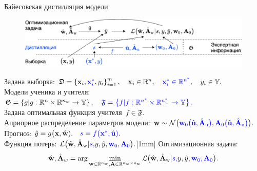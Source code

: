 \documentclass[10pt,pdf,hyperref={unicode}]{beamer}
\begin{document}
\begin{frame}{Байесовская дистилляция модели}
\justifying
\begin{figure}[h!]
\includegraphics[width=1.0\textwidth]{slides/figures/introdigram_large}
\end{figure}

Задана выборка:
$
	\mathfrak{D} = \left\{\textbf{x}_i, {\color{blue}\textbf{x}_i^{*}}, y_i\right\}_{i=1}^{m}, 
	\quad \textbf{x}_{i} \in \mathbb{R}^{n}, 
	{\color{blue}\quad \textbf{x}_{i}^{*} \in \mathbb{R}^{n^{*}}},
	\quad y_i \in \mathbb{Y}.
$\\[1mm]
Модели ученика и учителя:
$
    \mathfrak{G} = \left\{g | g : \mathbb{R}^{n}\times \mathbb{R}^{n_{w}} \to \mathbb{Y} \right\},
{\color{blue}
    \quad \mathfrak{F} = \left\{f | f : \mathbb{R}^{n^{*}}\times \mathbb{R}^{n_{w}^{*}} \to \mathbb{Y} \right\}.
}
$\\[1mm]
{\color{blue}
Задана оптимальная функция учителя~$f \in \mathfrak{F}.$
}
\\[1mm]
Априорное распределение параметров модели:
$
    \textbf{w} \sim \mathcal{N}\bigr({\color{blue}\textbf{w}_0\bigr(\hat{\textbf{u}}, \hat{\textbf{A}}_{\text{u}}\bigr)}, {\color{blue}\textbf{A}_0\bigr(\hat{\textbf{u}}, \hat{\textbf{A}}_{\text{u}}\bigr)}\bigr).
$\\[1mm]
Прогноз:
$
    \hat{y} = g\bigr(\textbf{x}, \hat{\textbf{w}}).
{\color{blue}
    \quad
    s = f\bigr(\textbf{x}^{*}, \hat{\textbf{u}}).
}
$\\[1mm]
Функция потерь:
$
    \mathcal{L}\bigr(\hat{\textbf{w}},\hat{\textbf{A}}_{\text{w}}|{\color{blue} s, }y, \hat{y}, {\color{blue}\textbf{w}_0, \textbf{A}_0}\bigr).
$[1mm]
Оптимизационная задача:
\[
    \hat{\textbf{w}}, \hat{\textbf{A}}_{w} = \arg \min_{\textbf{w} \in \mathbb{R}^{n_{w}}, \textbf{A} \in \mathbb{R}^{n_{w}\times n_{w}}} \mathcal{L}\bigr(\hat{\textbf{w}},\hat{\textbf{A}}_{\text{w}}|{\color{blue} s, }y, \hat{y}, {\color{blue}\textbf{w}_0, \textbf{A}_0}\bigr).
\]
\end{frame}

\end{document}
